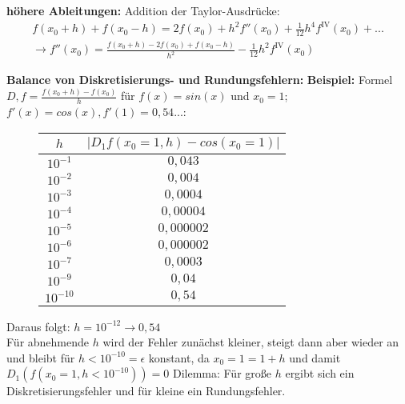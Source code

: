 \documentclass{scrartcl}
\begin{document}
\textbf{höhere Ableitungen:}
Addition der Taylor-Ausdrücke:
\begin{align*}
f(x_0+h)+f(x_0-h)= 2 f(x_0)+ h^2 f''(x_0) + \frac{1}{12} h^4 f^{\text{IV}}(x_0)+... \\
\rightarrow f''(x_0)= \frac{f(x_0+h)-2 f(x_0)+f(x_0-h)}{h^2} - \frac{1}{12} h^2 f^{\text{IV}}(x_0)
\end{align*}

\textbf{Balance von Diskretisierungs- und Rundungsfehlern:}
\textbf{Beispiel:} Formel $D,f=\frac{f(x_0+h)-f(x_0)}{h}$ für $f(x)= sin(x)$ und $x_0=1$; $f'(x)=cos(x), f'(1)=0,54...$: \\

\begin{figure}[h]
\center
\begin{tabular}{c|c}

$h$ & $|D_1 f(x_0=1,h)-cos(x_0=1)|$\\ 
\hline 
$10^{-1}$ & $0,043$ \\  
$10^{-2}$ & $0,004$ \\
$10^{-3}$ & $0,0004$ \\
$10^{-4}$ & $0,00004$ \\
$10^{-5}$ & $0,000002$ \\
$10^{-6}$ & $0,000002$ \\ 
$10^{-7}$ & $0,0003$ \\
$10^{-9}$ & $0,04$ \\
$10^{-10}$ & $0,54$ \\
\end{tabular}
\end{figure}
\newpage
Daraus folgt:
$h=10^{-12} \rightarrow 0,54$\\
Für abnehmende $h$ wird der Fehler zunächst kleiner, steigt dann aber wieder an und bleibt für $h<10^{-10}= \epsilon$ konstant, da $x_0=1=1+h$ und damit $D_1(f(x_0=1, h<10^{-10}))=0$
Dilemma: Für große $h$ ergibt sich ein Diskretisierungsfehler und für kleine ein Rundungsfehler. 
\end{document}
